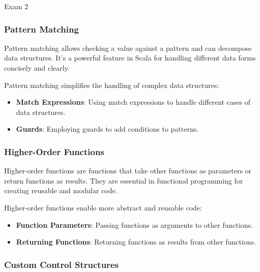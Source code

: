 \begin{examnotes}{Exam 2}
    \subsubsection*{Pattern Matching}
    
    Pattern matching allows checking a value against a pattern and can decompose data structures. It's a powerful feature in Scala for handling different data forms concisely and clearly.
    
    \begin{highlight}
        Pattern matching simplifies the handling of complex data structures:
        \begin{itemize}
            \item \textbf{Match Expressions}: Using match expressions to handle different cases of data structures.
            \item \textbf{Guards}: Employing guards to add conditions to patterns.
        \end{itemize}
    \end{highlight}
    
    \subsubsection*{Higher-Order Functions}
    
    Higher-order functions are functions that take other functions as parameters or return functions as results. They are essential in functional programming for creating reusable and modular code.
    
    \begin{highlight}
        Higher-order functions enable more abstract and reusable code:
        \begin{itemize}
            \item \textbf{Function Parameters}: Passing functions as arguments to other functions.
            \item \textbf{Returning Functions}: Returning functions as results from other functions.
        \end{itemize}
    \end{highlight}
    
    \subsubsection*{Custom Control Structures}
    

\end{examnotes}
